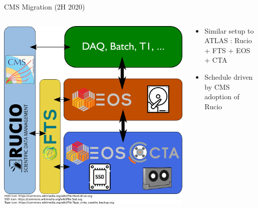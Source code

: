 \documentclass[aspectratio=1610]{beamer}
\begin{document}
\begin{frame}{CMS Migration (2H 2020)}
\begin{columns}
	\begin{column}{0.4\textwidth}
		\begin{center}
		  \includegraphics[width=\textwidth]{images/CTA_Deployment_CMS.pdf}
		\end{center}
	\end{column}
	\begin{column}{0.55\textwidth}
		\begin{itemize}
		  \item Similar setup to ATLAS : Rucio + FTS + EOS + CTA
        \item Schedule driven by CMS adoption of Rucio
		\end{itemize}
	\end{column}
\end{columns}
\end{frame}
\end{document}
